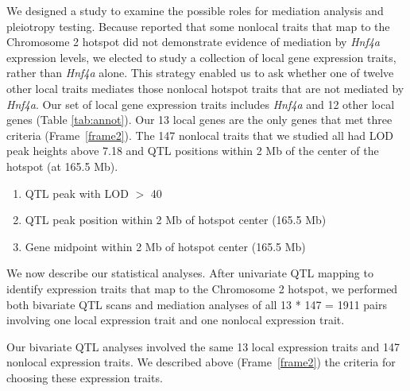 \documentclass[oneside]{book}\usepackage[]{graphicx}\usepackage[]{color}
\newenvironment{frameenv}[1]
    {\begin{myfloat}[tb]
    \begin{mdframed}[roundcorner=10pt,backgroundcolor=blue!10]
    \caption{#1}
    }
    {%
    \end{mdframed}\end{myfloat}
    }
\begin{document}
We designed a study to examine the possible roles for mediation analysis and pleiotropy testing. 
Because \citet{keller2018genetic} reported that some nonlocal traits that map to 
the Chromosome 2 hotspot did not demonstrate evidence of mediation by \emph{Hnf4a} expression
levels, we elected to study a collection of local gene expression traits, 
rather than \emph{Hnf4a} alone.
This strategy enabled us to ask whether one of twelve other local traits mediates those 
nonlocal hotspot traits that are not mediated by \emph{Hnf4a}. 
Our set of local gene expression traits includes \emph{Hnf4a} and 12 
other local genes (Table \ref{tab:annot}). 
Our 13 local genes are the only genes that met three criteria (Frame~\ref{frame2}).
The 147 nonlocal traits that we studied all had LOD peak heights above 7.18 and QTL positions within 2 Mb of the center of the hotspot (at 165.5 Mb).



\begin{frameenv}{Local gene inclusion criteria}\label{frame2}
\begin{enumerate}
    \item QTL peak with LOD $>$ 40
    \item QTL peak position within 2 Mb of hotspot center (165.5 Mb)
    \item Gene midpoint within 2 Mb of hotspot center (165.5 Mb)
\end{enumerate}
\end{frameenv}




We now describe our statistical analyses. 
After univariate QTL mapping to identify expression traits that 
map to the Chromosome 2 hotspot, 
we performed both bivariate QTL scans and mediation analyses of all 13 * 147 = 1911 pairs
involving one local expression trait and one nonlocal expression trait.




Our bivariate QTL analyses involved the same 13 local expression traits and 147 nonlocal expression traits. 
We described above (Frame~\ref{frame2}) the criteria for choosing these expression traits.
\end{document}
